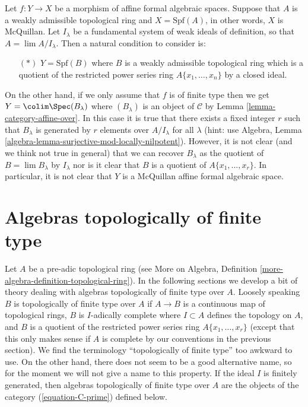 \begin{remark}
\label{remark-finite-type}
Let $f : Y \to X$ be a morphism of affine formal algebraic spaces.
Suppose that $A$ is a weakly admissible topological ring and
$X = \text{Spf}(A)$, in other words, $X$ is McQuillan. Let $I_\lambda$ be a
fundamental system of weak ideals of definition, so that
$A = \lim A/I_\lambda$. Then a natural condition to consider is:
\begin{itemize}
\item[$(*)$] $Y = \text{Spf}(B)$ where $B$ is a weakly admissible
topological ring which is a quotient of the restricted power series ring
$A\{x_1, \ldots, x_n\}$ by a closed ideal.
\end{itemize}
On the other hand, if we only assume that $f$ is of finite type
then we get $Y = \colim \Spec(B_\lambda)$ where
$(B_\lambda)$ is an object of $\mathcal{C}$ by
Lemma \ref{lemma-category-affine-over}.
In this case it is true that there exists a fixed integer $r$ such
that $B_\lambda$ is generated by $r$ elements over $A/I_\lambda$ for
all $\lambda$ (hint: use
Algebra, Lemma \ref{algebra-lemma-surjective-mod-locally-nilpotent}).
However, it is not clear (and we think not true in general) that we can recover
$B_\lambda$ as the quotient of $B = \lim B_\lambda$ by $I_\lambda$
nor is it clear that $B$ is a quotient of $A\{x_1, \ldots, x_r\}$.
In particular, it is not clear that $Y$ is a McQuillan affine
formal algebraic space.
\end{remark}





\section{Algebras topologically of finite type}
\label{section-tft}

\noindent
Let $A$ be a pre-adic topological ring (see More on Algebra, Definition
\ref{more-algebra-definition-topological-ring}).
In the following sections we develop a bit of theory dealing with
algebras topologically of finite type over $A$.
Loosely speaking $B$ is topologically of finite type over $A$
if $A \to B$ is a continuous map of topological rings,
$B$ is $I$-adically complete where $I \subset A$ defines the topology
on $A$, and $B$ is a quotient of the restricted power series
ring $A\{x_1, \ldots, x_r\}$ (except that this only makes sense if
$A$ is complete by our conventions in the previous section).
We find the terminology ``topologically of finite type'' too awkward to use.
On the other hand, there does not seem to be
a good alternative name, so for the moment we will not give a name to
this property. If the ideal $I$ is finitely generated, then
algebras topologically of finite type over $A$ are the objects
of the category (\ref{equation-C-prime}) defined below.




